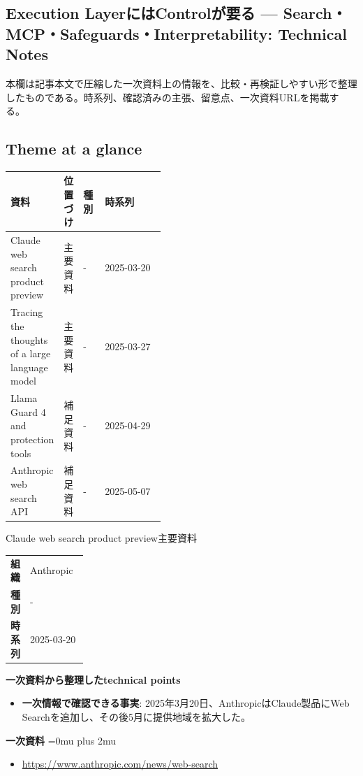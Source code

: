 \subsection*{Execution LayerにはControlが要る — Search・MCP・Safeguards・Interpretability: Technical Notes}
本欄は記事本文で圧縮した一次資料上の情報を、比較・再検証しやすい形で整理したものである。時系列、確認済みの主張、留意点、一次資料URLを掲載する。
\medskip
\subsection*{Theme at a glance}
\begin{center}
\footnotesize
\begin{tabularx}{\linewidth}{@{}p{0.20\linewidth}p{0.10\linewidth}p{0.14\linewidth}X@{}}
\toprule
資料 & 位置づけ & 種別 & 時系列 \\
\midrule
Claude web search product preview & 主要資料 & - & 2025-03-20   \\
Tracing the thoughts of a large language model & 主要資料 & - & 2025-03-27   \\
Llama Guard 4 and protection tools & 補足資料 & - & 2025-04-29   \\
Anthropic web search API & 補足資料 & - & 2025-05-07   \\
\bottomrule
\end{tabularx}
\end{center}
\normalsize

\begin{technicalnote}{Claude web search product preview}{主要資料}
\begingroup
\begin{tabularx}{\linewidth}{@{}>{\bfseries}p{0.22\linewidth}X@{}}
組織 & Anthropic \\
種別 & - \\
時系列 & 2025-03-20 \\
\end{tabularx}
\smallskip
{\bfseries 一次資料から整理したtechnical points}
\begin{itemize}[leftmargin=1.5em,itemsep=0.35em]
\item \textbf{一次情報で確認できる事実}: 2025年3月20日、AnthropicはClaude製品にWeb Searchを追加し、その後5月に提供地域を拡大した。
\end{itemize}
\begin{samepage}
{\bfseries 一次資料}
\begingroup\sloppy
\Urlmuskip=0mu plus 2mu\relax
\begin{itemize}[leftmargin=1.5em,itemsep=0.25em]
\item {\scriptsize\url{https://www.anthropic.com/news/web-search}}
\end{itemize}
\endgroup
\end{samepage}
\endgroup
\end{technicalnote}
\medskip

